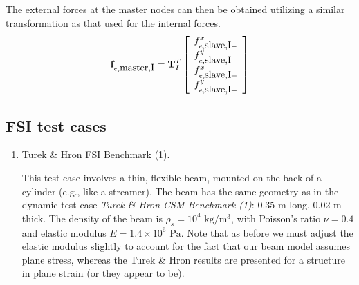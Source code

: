 \documentclass{article}
\begin{document}
The external forces at the master nodes can then be obtained utilizing a similar transformation as that used for the internal forces.
\[ {\bf f}_{e,\mbox{master,I}} = {\bf T}_I^T \left[ \begin{array}{c} f_{e, \mbox{slave,I}-}^x \\  f_{e, \mbox{slave,I}-}^y \\ f_{e, \mbox{slave,I}+}^x \\  f_{e, \mbox{slave,I}+}^y \end{array} \right]  \]

\subsection{FSI test cases}
\begin{enumerate}
\item Turek \& Hron FSI Benchmark (1).

This test case involves a thin, flexible beam, mounted on the back of a cylinder (e.g., like a streamer).
The beam has the same geometry as in the dynamic test case \emph{Turek \& Hron CSM Benchmark (1)}: 0.35 m long, 0.02 m thick.  
The density of the beam is $\rho_s = 10^4 \mbox{ kg/m$^3$}$, with Poisson's ratio $\nu = 0.4$ and elastic modulus $E = 1.4 \times 10^6 \mbox{ Pa}$.  
Note that as before we must adjust the elastic modulus slightly to account for the fact that our beam model assumes plane stress, whereas the Turek \& Hron results are presented for a structure in plane strain (or they appear to be).


\end{enumerate}
\end{document}
